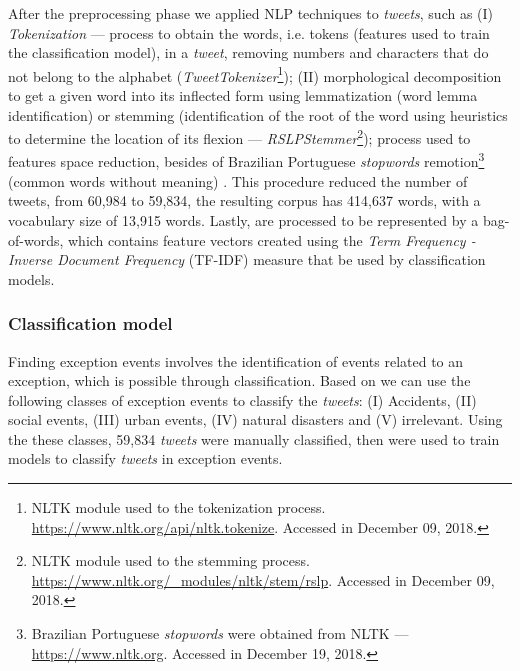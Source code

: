 \documentclass[runningheads]{llncs}
\begin{document}
After the preprocessing phase we applied NLP techniques to \textit{tweets}, such as (I) \textit{Tokenization} --- process to obtain the words, i.e. tokens (features used to train the classification model), in a \textit{tweet}, removing numbers and characters that do not belong to the alphabet (\textit{TweetTokenizer}\footnote{NLTK module used to the tokenization process. \url{https://www.nltk.org/api/nltk.tokenize}. Accessed in December 09, 2018.}); (II) morphological decomposition to get a given word into its inflected form using lemmatization (word lemma identification) or stemming (identification of the root of the word using heuristics to determine the location of its flexion --- \textit{RSLPStemmer}\footnote{NLTK module used to the stemming process. \url{https://www.nltk.org/\_modules/nltk/stem/rslp}. Accessed in December 09, 2018.}); process used to features space reduction, besides of Brazilian Portuguese \textit{stopwords} remotion\footnote{Brazilian Portuguese \textit{stopwords} were obtained from NLTK --- \url{https://www.nltk.org}. Accessed in December 19, 2018.} (common words without meaning) \cite{Setiawan2017, nadkarni2011natural, Korenius, roy2017understanding, collobert2011natural}. This procedure reduced the number of tweets, from 60,984 to 59,834,  the resulting corpus has 414,637 words, with a vocabulary size of 13,915 words. Lastly, are processed to be represented by a bag-of-words, which contains feature vectors created using the \textit{Term Frequency - Inverse Document Frequency} (TF-IDF) measure that be used by classification models.

\subsubsection{Classification model}
\label{featuresEng}




Finding exception events involves the identification of events related to an exception, which is possible through classification. Based on \cite{Itoh2016, Chen2016, Lecue2014, Gal-Tzur2014} we can use the following classes of exception events to classify the \textit{tweets}: (I) Accidents, (II) social events, (III) urban events, (IV) natural disasters and (V) irrelevant. Using the these classes, 59,834 \textit{tweets} were manually classified, then were used to train models to classify \textit{tweets} in exception events. 
\end{document}
